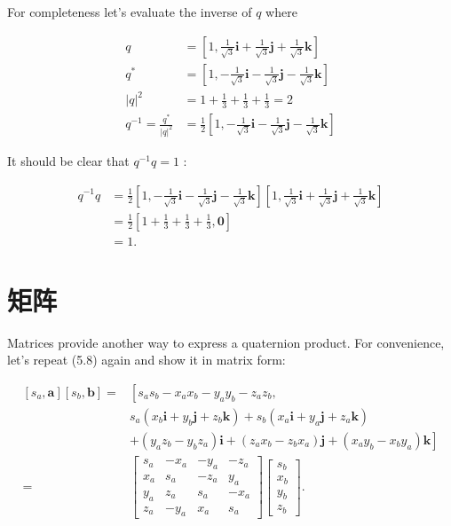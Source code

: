 For completeness let's evaluate the inverse of $q$ where

$$
\begin{aligned}
q & =\left[1, \frac{1}{\sqrt{3}} \mathbf{i}+\frac{1}{\sqrt{3}} \mathbf{j}+\frac{1}{\sqrt{3}} \mathbf{k}\right] \\
q^{*} & =\left[1,-\frac{1}{\sqrt{3}} \mathbf{i}-\frac{1}{\sqrt{3}} \mathbf{j}-\frac{1}{\sqrt{3}} \mathbf{k}\right] \\
|q|^{2} & =1+\frac{1}{3}+\frac{1}{3}+\frac{1}{3}=2 \\
q^{-1}=\frac{q^{*}}{|q|^{2}} & =\frac{1}{2}\left[1,-\frac{1}{\sqrt{3}} \mathbf{i}-\frac{1}{\sqrt{3}} \mathbf{j}-\frac{1}{\sqrt{3}} \mathbf{k}\right]
\end{aligned}
$$

It should be clear that $q^{-1} q=1$ :

$$
\begin{aligned}
q^{-1} q & =\frac{1}{2}\left[1,-\frac{1}{\sqrt{3}} \mathbf{i}-\frac{1}{\sqrt{3}} \mathbf{j}-\frac{1}{\sqrt{3}} \mathbf{k}\right]\left[1, \frac{1}{\sqrt{3}} \mathbf{i}+\frac{1}{\sqrt{3}} \mathbf{j}+\frac{1}{\sqrt{3}} \mathbf{k}\right] \\
& =\frac{1}{2}\left[1+\frac{1}{3}+\frac{1}{3}+\frac{1}{3}, \mathbf{0}\right] \\
& =1 .
\end{aligned}
$$

\section{矩阵}
Matrices provide another way to express a quaternion product. For convenience, let's repeat (5.8) again and show it in matrix form:

$$
\begin{aligned}
{\left[s_{a}, \mathbf{a}\right]\left[s_{b}, \mathbf{b}\right]=} & {\left[s_{a} s_{b}-x_{a} x_{b}-y_{a} y_{b}-z_{a} z_{b},\right.} \\
& s_{a}\left(x_{b} \mathbf{i}+y_{b} \mathbf{j}+z_{b} \mathbf{k}\right)+s_{b}\left(x_{a} \mathbf{i}+y_{a} \mathbf{j}+z_{a} \mathbf{k}\right) \\
& \left.+\left(y_{a} z_{b}-y_{b} z_{a}\right) \mathbf{i}+\left(z_{a} x_{b}-z_{b} x_{a}\right) \mathbf{j}+\left(x_{a} y_{b}-x_{b} y_{a}\right) \mathbf{k}\right] \\
= & {\left[\begin{array}{cccc}
s_{a} & -x_{a} & -y_{a} & -z_{a} \\
x_{a} & s_{a} & -z_{a} & y_{a} \\
y_{a} & z_{a} & s_{a} & -x_{a} \\
z_{a} & -y_{a} & x_{a} & s_{a}
\end{array}\right]\left[\begin{array}{c}
s_{b} \\
x_{b} \\
y_{b} \\
z_{b}
\end{array}\right] . }
\end{aligned}
$$

